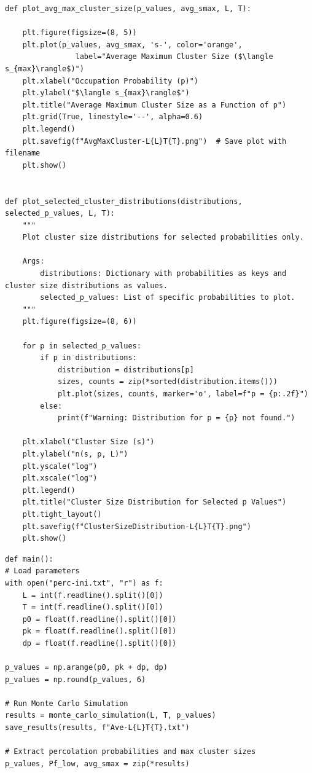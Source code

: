 \documentclass[10pt,letterpaper, onecolumn]{report}
\begin{document}
\begin{flushleft}
\begin{enumerate}
\begin{lstlisting}[style=myPythonStyle, caption={Percolation Simulation Code}]
def plot_avg_max_cluster_size(p_values, avg_smax, L, T):

    plt.figure(figsize=(8, 5))
    plt.plot(p_values, avg_smax, 's-', color='orange',
                label="Average Maximum Cluster Size ($\langle s_{max}\rangle$)")
    plt.xlabel("Occupation Probability (p)")
    plt.ylabel("$\langle s_{max}\rangle$")
    plt.title("Average Maximum Cluster Size as a Function of p")
    plt.grid(True, linestyle='--', alpha=0.6)
    plt.legend()
    plt.savefig(f"AvgMaxCluster-L{L}T{T}.png")  # Save plot with filename
    plt.show()


def plot_selected_cluster_distributions(distributions, selected_p_values, L, T):
    """
    Plot cluster size distributions for selected probabilities only.
    
    Args:
        distributions: Dictionary with probabilities as keys and cluster size distributions as values.
        selected_p_values: List of specific probabilities to plot.
    """
    plt.figure(figsize=(8, 6))

    for p in selected_p_values:
        if p in distributions:
            distribution = distributions[p]
            sizes, counts = zip(*sorted(distribution.items()))
            plt.plot(sizes, counts, marker='o', label=f"p = {p:.2f}")
        else:
            print(f"Warning: Distribution for p = {p} not found.")

    plt.xlabel("Cluster Size (s)")
    plt.ylabel("n(s, p, L)")
    plt.yscale("log")
    plt.xscale("log")
    plt.legend()
    plt.title("Cluster Size Distribution for Selected p Values")
    plt.tight_layout()
    plt.savefig(f"ClusterSizeDistribution-L{L}T{T}.png")
    plt.show()
        \end{lstlisting}

        \begin{lstlisting}[style=myPythonStyle, caption={Main part of the code}]
def main():
# Load parameters
with open("perc-ini.txt", "r") as f:
    L = int(f.readline().split()[0])
    T = int(f.readline().split()[0])
    p0 = float(f.readline().split()[0])
    pk = float(f.readline().split()[0])
    dp = float(f.readline().split()[0])

p_values = np.arange(p0, pk + dp, dp)
p_values = np.round(p_values, 6)

# Run Monte Carlo Simulation
results = monte_carlo_simulation(L, T, p_values)
save_results(results, f"Ave-L{L}T{T}.txt")

# Extract percolation probabilities and max cluster sizes
p_values, Pf_low, avg_smax = zip(*results)


\end{lstlisting}
\end{enumerate}
\end{flushleft}
\end{document}
